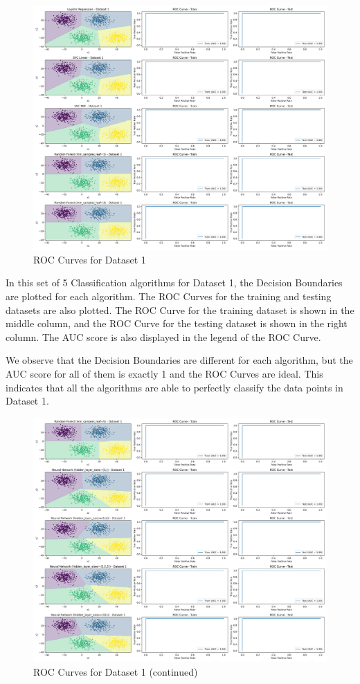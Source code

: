 \clearpage

\begin{figure}[H]
    \centering
    \includegraphics[width=\textwidth]{Images/dataset-1-roc-curves-1.png}
    \caption{ROC Curves for Dataset 1}
\end{figure}

In this set of 5 Classification algorithms for Dataset 1, the Decision Boundaries are plotted for each algorithm. The ROC Curves for the training and testing datasets are also plotted. The ROC Curve for the training dataset is shown in the middle column, and the ROC Curve for the testing dataset is shown in the right column. The AUC score is also displayed in the legend of the ROC Curve.

We observe that the Decision Boundaries are different for each algorithm, but the AUC score for all of them is exactly 1 and the ROC Curves are ideal. This indicates that all the algorithms are able to perfectly classify the data points in Dataset 1.

\begin{figure}[H]
    \centering
    \includegraphics[width=\textwidth]{Images/dataset-1-roc-curves-2.png}
    \caption{ROC Curves for Dataset 1 (continued)}
\end{figure}

